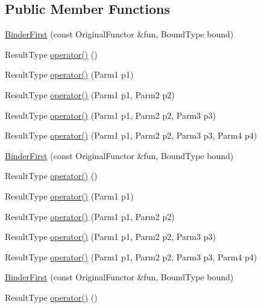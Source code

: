 \subsection*{Public Member Functions}
\begin{DoxyCompactItemize}
\item 
\mbox{\hyperlink{classUtil_1_1BinderFirst_a30caf0805ca9b22a13b3b79babd10054}{Binder\+First}} (const Original\+Functor \&fun, Bound\+Type bound)
\item 
Result\+Type \mbox{\hyperlink{classUtil_1_1BinderFirst_aaf3277caca5fced7454825a2f2920847}{operator()}} ()
\item 
Result\+Type \mbox{\hyperlink{classUtil_1_1BinderFirst_abaf2000002a79a24771bbf52ef7e960c}{operator()}} (Parm1 p1)
\item 
Result\+Type \mbox{\hyperlink{classUtil_1_1BinderFirst_a7abd5ef4f28a0496beb24d4295e1d181}{operator()}} (Parm1 p1, Parm2 p2)
\item 
Result\+Type \mbox{\hyperlink{classUtil_1_1BinderFirst_ac047de2a3489ae79b79d01e873e079c6}{operator()}} (Parm1 p1, Parm2 p2, Parm3 p3)
\item 
Result\+Type \mbox{\hyperlink{classUtil_1_1BinderFirst_ae11ec27f2d62ef1594ef033d8a9f3135}{operator()}} (Parm1 p1, Parm2 p2, Parm3 p3, Parm4 p4)
\item 
\mbox{\hyperlink{classUtil_1_1BinderFirst_a30caf0805ca9b22a13b3b79babd10054}{Binder\+First}} (const Original\+Functor \&fun, Bound\+Type bound)
\item 
Result\+Type \mbox{\hyperlink{classUtil_1_1BinderFirst_aaf3277caca5fced7454825a2f2920847}{operator()}} ()
\item 
Result\+Type \mbox{\hyperlink{classUtil_1_1BinderFirst_abaf2000002a79a24771bbf52ef7e960c}{operator()}} (Parm1 p1)
\item 
Result\+Type \mbox{\hyperlink{classUtil_1_1BinderFirst_a7abd5ef4f28a0496beb24d4295e1d181}{operator()}} (Parm1 p1, Parm2 p2)
\item 
Result\+Type \mbox{\hyperlink{classUtil_1_1BinderFirst_ac047de2a3489ae79b79d01e873e079c6}{operator()}} (Parm1 p1, Parm2 p2, Parm3 p3)
\item 
Result\+Type \mbox{\hyperlink{classUtil_1_1BinderFirst_ae11ec27f2d62ef1594ef033d8a9f3135}{operator()}} (Parm1 p1, Parm2 p2, Parm3 p3, Parm4 p4)
\item 
\mbox{\hyperlink{classUtil_1_1BinderFirst_a30caf0805ca9b22a13b3b79babd10054}{Binder\+First}} (const Original\+Functor \&fun, Bound\+Type bound)
\item 
Result\+Type \mbox{\hyperlink{classUtil_1_1BinderFirst_aaf3277caca5fced7454825a2f2920847}{operator()}} ()

\end{DoxyCompactItemize}
